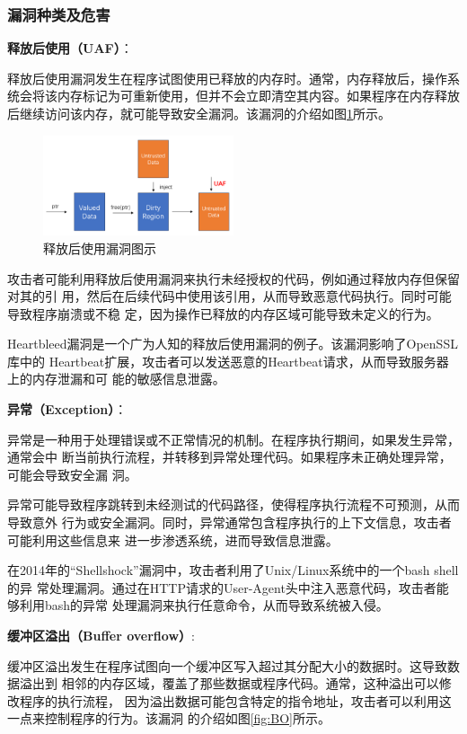 \subsubsection{漏洞种类及危害}
\textbf{释放后使用（UAF）}：

释放后使用漏洞发生在程序试图使用已释放的内存时。通常，内存释放后，操作系统会将该内存标记为可重新使用，但并不会立即清空其内容。如果程序在内存释放后继续访问该内存，就可能导致安全漏洞。该漏洞的介绍如图\ref{fig:UAF}所示。
	\begin{figure}[htbp]
		\centering
		\includegraphics[width=0.5\textwidth]{pictures/UAF.png}
		\caption{释放后使用漏洞图示}
		\label{fig:UAF}
	\end{figure}

攻击者可能利用释放后使用漏洞来执行未经授权的代码，例如通过释放内存但保留对其的引
用，然后在后续代码中使用该引用，从而导致恶意代码执行。同时可能导致程序崩溃或不稳
定，因为操作已释放的内存区域可能导致未定义的行为。

Heartbleed漏洞是一个广为人知的释放后使用漏洞的例子。该漏洞影响了OpenSSL库中的
Heartbeat扩展，攻击者可以发送恶意的Heartbeat请求，从而导致服务器上的内存泄漏和可
能的敏感信息泄露。

\textbf{异常（Exception）}：
	
异常是一种用于处理错误或不正常情况的机制。在程序执行期间，如果发生异常，通常会中
断当前执行流程，并转移到异常处理代码。如果程序未正确处理异常，可能会导致安全漏
洞。

异常可能导致程序跳转到未经测试的代码路径，使得程序执行流程不可预测，从而导致意外
行为或安全漏洞。同时，异常通常包含程序执行的上下文信息，攻击者可能利用这些信息来
进一步渗透系统，进而导致信息泄露。

在2014年的``Shellshock''漏洞中，攻击者利用了Unix/Linux系统中的一个bash shell的异
常处理漏洞。通过在HTTP请求的User-Agent头中注入恶意代码，攻击者能够利用bash的异常
处理漏洞来执行任意命令，从而导致系统被入侵。
	
\textbf{缓冲区溢出（Buffer overflow）}:
	
缓冲区溢出发生在程序试图向一个缓冲区写入超过其分配大小的数据时。这导致数据溢出到
相邻的内存区域，覆盖了那些数据或程序代码。通常，这种溢出可以修改程序的执行流程，
因为溢出数据可能包含特定的指令地址，攻击者可以利用这一点来控制程序的行为。该漏洞
的介绍如图\ref{fig:BO}所示。
	
